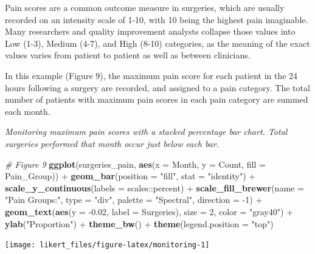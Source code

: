 \documentclass[]{book}
\newenvironment{Shaded}{\begin{snugshade}}{\end{snugshade}}
\newcommand{\KeywordTok}[1]{\textcolor[rgb]{0.13,0.29,0.53}{\textbf{{#1}}}}
\newcommand{\DataTypeTok}[1]{\textcolor[rgb]{0.13,0.29,0.53}{{#1}}}
\newcommand{\DecValTok}[1]{\textcolor[rgb]{0.00,0.00,0.81}{{#1}}}
\newcommand{\FloatTok}[1]{\textcolor[rgb]{0.00,0.00,0.81}{{#1}}}
\newcommand{\StringTok}[1]{\textcolor[rgb]{0.31,0.60,0.02}{{#1}}}
\newcommand{\CommentTok}[1]{\textcolor[rgb]{0.56,0.35,0.01}{\textit{{#1}}}}
\newcommand{\NormalTok}[1]{{#1}}
\begin{document}
Pain scores are a common outcome measure in surgeries, which are usually
recorded on an intensity scale of 1-10, with 10 being the highest pain
imaginable. Many researchers and quality improvement analysts collapse
those values into Low (1-3), Medium (4-7), and High (8-10) categories,
as the meaning of the exact values varies from patient to patient as
well as between clinicians.

In this example (Figure 9), the maximum pain score for each patient in
the 24 hours following a surgery are recorded, and assigned to a pain
category. The total number of patients with maximum pain scores in each
pain category are summed each month.

\emph{Monitoring maximum pain scores with a stacked percentage bar
chart. Total surgeries performed that month occur just below each bar.}

\begin{Shaded}
\begin{Highlighting}[]
\CommentTok{# Figure 9}
\KeywordTok{ggplot}\NormalTok{(surgeries_pain, }\KeywordTok{aes}\NormalTok{(}\DataTypeTok{x =} \NormalTok{Month, }\DataTypeTok{y =} \NormalTok{Count, }\DataTypeTok{fill =} \NormalTok{Pain_Group)) +}
\StringTok{  }\KeywordTok{geom_bar}\NormalTok{(}\DataTypeTok{position =} \StringTok{"fill"}\NormalTok{, }\DataTypeTok{stat =} \StringTok{"identity"}\NormalTok{) +}
\StringTok{  }\KeywordTok{scale_y_continuous}\NormalTok{(}\DataTypeTok{labels =} \NormalTok{scales::percent) +}
\StringTok{  }\KeywordTok{scale_fill_brewer}\NormalTok{(}\DataTypeTok{name =} \StringTok{"Pain Groups:"}\NormalTok{, }\DataTypeTok{type =} \StringTok{"div"}\NormalTok{, }\DataTypeTok{palette =} \StringTok{"Spectral"}\NormalTok{, }\DataTypeTok{direction =} \NormalTok{-}\DecValTok{1}\NormalTok{) +}
\StringTok{  }\KeywordTok{geom_text}\NormalTok{(}\KeywordTok{aes}\NormalTok{(}\DataTypeTok{y =} \NormalTok{-}\FloatTok{0.02}\NormalTok{, }\DataTypeTok{label =} \NormalTok{Surgeries), }\DataTypeTok{size =} \DecValTok{2}\NormalTok{, }\DataTypeTok{color =} \StringTok{"gray40"}\NormalTok{) +}
\StringTok{  }\KeywordTok{ylab}\NormalTok{(}\StringTok{"Proportion"}\NormalTok{) +}\StringTok{ }
\StringTok{  }\KeywordTok{theme_bw}\NormalTok{() +}
\StringTok{  }\KeywordTok{theme}\NormalTok{(}\DataTypeTok{legend.position =} \StringTok{"top"}\NormalTok{)}
\end{Highlighting}
\end{Shaded}

\begin{center}\texttt{[image: likert\_files/figure-latex/monitoring-1]} \end{center}
\end{document}
